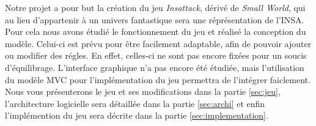 Notre projet a pour but la création du jeu \emph{Insattack}, dérivé de \emph{Small World}, qui au lieu d'appartenir à un univers fantastique sera une réprésentation de l'INSA. Pour cela nous avons étudié le fonctionnement du jeu et réalisé la conception du modèle. Celui-ci est prévu pour être facilement adaptable, afin de pouvoir ajouter ou modifier des régles. En effet, celles-ci ne sont pas encore fixées pour un soucis d'équilibrage.
\medbreak
L'interface graphique n'a pas encore été étudiée, mais l'utilisation du modèle MVC pour l'implémentation du jeu permettra de l'intégrer faiclement.
\medbreak
Nous vous présenterons le jeu et ses modifications dans la partie \ref{sec:jeu}, l'architecture logicielle sera détaillée dans la partie \ref{sec:archi} et enfin l'implémention du jeu sera décrite dans la partie \ref{sec:implementation}.  